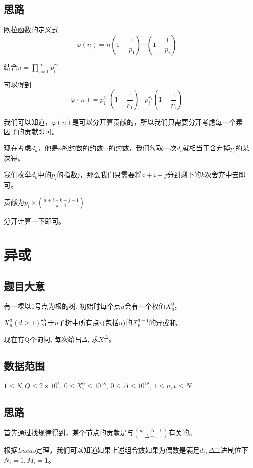 \documentclass{ctexart}
\numberwithin{equation}{section}
\begin{document}
\begin{flushleft}
  \subsection{思路}
  欧拉函数的定义式$$\varphi(n)=n(1-\frac{1}{p_1})\cdots (1-\frac{1}{p_i})$$

  结合$n = \prod_{i=1}^{m}p_{i}^{x_i}$

  可以得到$$\varphi(n)=p_{1}^{x_1}(1-\frac{1}{p_1})\cdots p_{i}^{x_i}(1-\frac{1}{p_i})$$

  我们可以知道，$\varphi(n)$是可以分开算贡献的，所以我们只需要分开考虑每一个素因子的贡献即可。

  现在考虑$d_k$，他是$n$的约数的约数$\cdots $的约数，我们每取一次$d_i$就相当于舍弃掉$p_i$的某次幂。

  我们枚举$d_k$中的$p_i$的指数$j$，那么我们只需要将$a+i-j$分到剩下的$k$次舍弃中去即可。

  贡献为$p_i\times \binom{a+i+k-j-1}{k-1}$

  分开计算一下即可。

  \newpage

  \section{异或}
  \subsection{题目大意}
  有一棵以1号点为根的树, 初始时每个点$u$会有一个权值$X_{u}^{0}$。

  $X_{u}^{d} (d \ge 1)$等于$u$子树中所有点$v$(包括$u$)的$X_{v}^{d - 1}$的异或和。

  现在有Q个询问, 每次给出$\Delta$, 求$X_{1}^{\Delta}$。
    

  \subsection{数据范围}
 $1 \leq N, Q \leq 2 \times 10^5$, $0 \leq X_{i}^{0} \leq 10^{18}$, $0 \leq \Delta \leq 10^{18}$, $1 \leq u,v \leq N$
  \subsection{思路}
  首先通过找规律得到，某个节点的贡献是与$\binom{d_i+\Delta-1}{\Delta-1}$有关的。

  根据$Lucas$定理，我们可以知道如果上述组合数如果为偶数是满足$d_i,\Delta$二进制位下$N_i=1,M_i=1$。


\end{flushleft}
\end{document}

